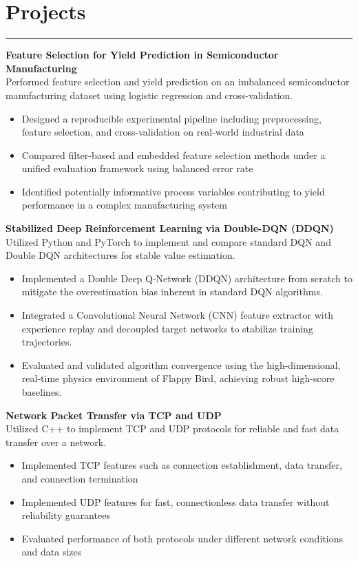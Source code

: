\documentclass[12pt]{article}
\begin{document}
\section*{\textbf{Projects}}
\vspace{-3pt}
\hrule
\vspace{10pt}
\textbf{Feature Selection for Yield Prediction in Semiconductor Manufacturing}\\
Performed feature selection and yield prediction on an imbalanced semiconductor manufacturing dataset using logistic regression and cross-validation.
\begin{itemize}[leftmargin=16pt, topsep=2pt, itemsep=0pt]
    \item Designed a reproducible experimental pipeline including preprocessing, feature selection, and cross-validation on real-world industrial data
    \item Compared filter-based and embedded feature selection methods under a unified evaluation framework using balanced error rate
    \item Identified potentially informative process variables contributing to yield performance in a complex manufacturing system
\end{itemize}

\vspace{5pt}

\textbf{Stabilized Deep Reinforcement Learning via Double-DQN (DDQN)}\\
Utilized Python and PyTorch to implement and compare standard DQN and Double DQN architectures for stable value estimation.
\begin{itemize}[leftmargin=16pt, topsep=2pt, itemsep=0pt]
    \item Implemented a Double Deep Q-Network (DDQN) architecture from scratch to mitigate the overestimation bias inherent in standard DQN algorithms.
    \item Integrated a Convolutional Neural Network (CNN) feature extractor with experience replay and decoupled target networks to stabilize training trajectories.
    \item Evaluated and validated algorithm convergence using the high-dimensional, real-time physics environment of Flappy Bird, achieving robust high-score baselines.
\end{itemize}

\vspace{5pt}

\textbf{Network Packet Transfer via TCP and UDP}\\
Utilized C++ to implement TCP and UDP protocols for reliable and fast data transfer over a network.
\begin{itemize}[leftmargin=16pt, topsep=2pt, itemsep=0pt]
    \item Implemented TCP features such as connection establishment, data transfer, and connection termination
    \item Implemented UDP features for fast, connectionless data transfer without reliability guarantees
    \item Evaluated performance of both protocols under different network conditions and data sizes
\end{itemize}
\end{document}
